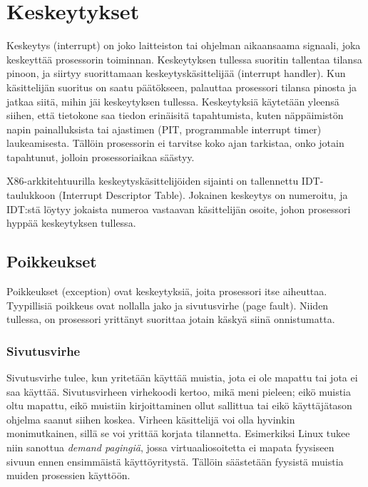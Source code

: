 \section{Keskeytykset}

Keskeytys (interrupt) on joko laitteiston tai ohjelman aikaansaama signaali, joka keskeyttää prosessorin toiminnan. Keskeytyksen tullessa suoritin tallentaa tilansa pinoon, ja siirtyy suorittamaan keskeytyskäsittelijää (interrupt handler). Kun käsittelijän suoritus on saatu päätökseen, palauttaa prosessori tilansa pinosta ja jatkaa siitä, mihin jäi keskeytyksen tullessa. Keskeytyksiä käytetään yleensä siihen, että tietokone saa tiedon erinäisitä tapahtumista, kuten näppäimistön napin painalluksista tai ajastimen (PIT, programmable interrupt timer) laukeamisesta. Tällöin prosessorin ei tarvitse koko ajan tarkistaa, onko jotain tapahtunut, jolloin prosessoriaikaa säästyy.

\par

X86-arkkitehtuurilla keskeytyskäsittelijöiden sijainti on tallennettu IDT-taulukkoon (Interrupt Descriptor Table). Jokainen keskeytys on numeroitu, ja IDT:stä löytyy jokaista numeroa vastaavan käsittelijän osoite, johon prosessori hyppää keskeytyksen tullessa.

\subsection{Poikkeukset}

Poikkeukset (exception) ovat keskeytyksiä, joita prosessori itse aiheuttaa. Tyypillisiä poikkeus ovat nollalla jako ja sivutusvirhe (page fault). Niiden tullessa, on prosessori yrittänyt suorittaa jotain käskyä siinä onnistumatta.

\subsubsection {Sivutusvirhe}

Sivutusvirhe tulee, kun yritetään käyttää muistia, jota ei ole mapattu tai jota ei saa käyttää. Sivutusvirheen virhekoodi kertoo, mikä meni pieleen; eikö muistia oltu mapattu, eikö muistiin kirjoittaminen ollut sallittua tai eikö käyttäjätason ohjelma saanut siihen koskea. Virheen käsittelijä voi olla hyvinkin monimutkainen, sillä se voi yrittää korjata tilannetta. Esimerkiksi Linux tukee niin sanottua \textit{demand pagingiä}, jossa virtuaaliosoitetta ei mapata fyysiseen sivuun ennen ensimmäistä käyttöyritystä. Tällöin säästetään fyysistä muistia muiden prosessien käyttöön.

